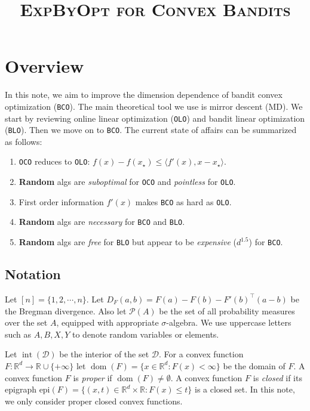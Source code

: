 \documentclass{article}
\title{\textsc{ExpByOpt for Convex Bandits}}
\theoremstyle{plain}
\theoremstyle{definition}
\newcommand{\dom}[1]{\operatorname{dom}(#1)}
\newcommand{\R}{\mathbb R}
\newcommand{\Rd}{\mathbb{R}^d}
\newcommand{\cD}{\mathcal D}
\newcommand{\cP}{\mathcal P}
\newcommand{\interior}{\operatorname{int}}
\newcommand{\mdalg}{\textsf{MD}\xspace}
\newcommand{\olo}{\texttt{OLO}\xspace}
\newcommand{\blo}{\texttt{BLO}\xspace}
\newcommand{\bco}{\texttt{BCO}\xspace}
\newcommand{\oco}{\texttt{OCO}\xspace}
\begin{document}
\maketitle

\section{Overview}
In this note, we aim to improve the dimension dependence of bandit convex optimization (\bco).
The main theoretical tool we use is mirror descent (\mdalg).
We start by reviewing online linear optimization (\olo) and bandit linear optimization (\blo).
Then we move on to \bco.
The current state of affairs can be summarized as follows:
\begin{enumerate}
    \item \oco reduces to \olo: $f(x) - f(x_\star) \leq \langle f'(x), x - x_\star \rangle$.
    \item \textbf{Random} algs are \textit{suboptimal} for \texttt{OCO} and \textit{pointless} for \texttt{OLO}.
    \item First order information $f'(x)$ makes \texttt{BCO} as hard as \texttt{OLO}.
    \item \textbf{Random} algs are \textit{necessary} for \texttt{BCO} and \texttt{BLO}.
    \item \textbf{Random} algs are \textit{free} for \texttt{BLO} but appear to be \textit{expensive} ($d^{1.5}$) for \texttt{BCO}.
\end{enumerate}
\subsection{Notation}
Let $[n] = \{1,2, \cdots, n\}$.
Let $D_F(a, b) = F(a) - F(b) - F'(b)^\top (a - b)$ be the Bregman divergence.
Also let $\cP(A)$ be the set of all probability measures over the set $A$,
equipped with appropriate $\sigma$-algebra.
We use uppercase letters such as $A, B, X, Y$ to denote random variables or elements.

Let $\interior(\cD)$ be the interior of the set $\cD$.
For a convex function $F: \Rd \to \R \cup \{+\infty\}$
let $\dom{F} = \{x \in \Rd: F(x) < \infty\}$ be the domain of $F$.
A convex function $F$ is \emph{proper} if $\dom{F} \neq \emptyset$.
A convex function $F$ is \emph{closed} if its epigraph $\text{epi}(F) = \{(x, t) \in \Rd \times \R: F(x) \leq t\}$ is a closed set.
In this note, we only consider proper closed convex functions.
\end{document}
